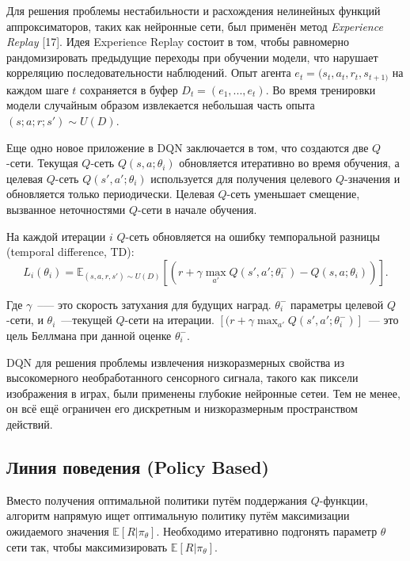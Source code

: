 Для решения проблемы нестабильности и расхождения нелинейных функций аппроксиматоров, таких как нейронные сети, был применён метод {\itshape Experience Replay} [17]. Идея Experience Replay состоит в том, чтобы равномерно рандомизировать предыдущие переходы при обучении модели, что нарушает корреляцию последовательности наблюдений. Опыт агента ${e_t = (s_t, a_t, r_t, s_{t+1)}}$ на каждом шаге $t$ сохраняется в буфер ${D_t = ({e_1, ..., e_t})}$. Во время тренировки модели случайным образом извлекается небольшая часть опыта ${(s; a; r; s') \sim U(D)}$.

Еще одно новое приложение в DQN заключается в том, что создаются две $Q$-сети.
Текущая $Q$-сеть $Q(s, a; \theta_i)$ обновляется итеративно во время обучения, а целевая $Q$-сеть $Q(s', a'; \theta_i)$ используется для получения целевого $Q$-значения и обновляется только периодически. Целевая $Q$-сеть уменьшает смещение, вызванное неточностями $Q$-сети в начале обучения.

На каждой итерации $i$ $Q$-сеть обновляется на ошибку темпоральной разницы (temporal difference, TD):
\begin{equation}
    \label{eq:someEq}
    L_i(\theta_i) = \mathbb{E}_{(s, a, r, s') \sim U(D)} [(r + \gamma \max_{a'} Q(s', a'; \theta_i^-) - Q(s, a; \theta _i))].
\end{equation}

Где $\gamma$~--— это скорость затухания для будущих наград. $\theta _i^-$ параметры целевой $Q$-сети, и $\theta_i$~---текущей $Q$-сети на итерации. $[(r + \gamma \max_{a'} Q(s', a'; \theta_i^-)]$~--- это цель Беллмана при данной оценке $\theta_i^-$.

DQN для решения проблемы извлечения низкоразмерных свойства из высокомерного необработанного сенсорного сигнала, такого как пиксели изображения в играх, были применены глубокие нейронные сетеи. Тем не менее, он всё ещё ограничен его дискретным и низкоразмерным пространством действий.

\subsection{Линия поведения (Policy Based)}

Вместо получения оптимальной политики путём поддержания $Q$-функции, алгоритм напрямую ищет оптимальную политику путём максимизации ожидаемого значения $\mathbb{E}[R|\pi_\theta]$. Необходимо итеративно подгонять параметр $\theta$ сети так, чтобы максимизировать $\mathbb{E}[R|\pi_\theta]$.


